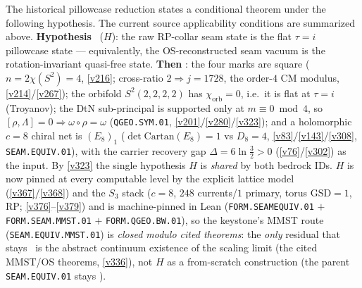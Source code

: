 \begin{keybox}
The historical pillowcase reduction states a conditional theorem under the
following hypothesis. The current source applicability conditions are summarized above.
\textbf{Hypothesis} \mO\ ($H$): the raw RP-collar seam state is the flat $\tau{=}i$ pillowcase state ---
equivalently, the OS-reconstructed seam vacuum is the rotation-invariant quasi-free state. \textbf{Then} \mE:
the four marks are square ($n{=}2\chi(S^2){=}4$, \vref{v216}; cross-ratio $2\Rightarrow j{=}1728$, the order-$4$
CM modulus, \vref{v214}/\vref{v267}); the orbifold $S^2(2,2,2,2)$ has $\chi_{\mathrm{orb}}{=}0$, i.e.\ it is flat
at $\tau{=}i$ (Troyanov); the DtN sub-principal is supported only at $m\equiv0\bmod4$, so
$[\rho,\Lambda]{=}0\Rightarrow\omega\circ\rho{=}\omega$ (\texttt{QGEO.SYM.01}, \vref{v201}/\vref{v280}/\vref{v323});
and a holomorphic $c{=}8$ chiral net is $(E_8)_1$ ($\det\mathrm{Cartan}(E_8){=}1$ vs $D_8{=}4$,
\vref{v83}/\vref{v143}/\vref{v308}, \texttt{SEAM.EQUIV.01}), with the carrier recovery gap
$\Delta{=}6\ln\tfrac32>0$ (\vref{v76}/\vref{v302}) as the input. By \vref{v323} the single hypothesis $H$ is
\emph{shared} by both bedrock IDs. $H$ is now pinned at every computable level by the explicit lattice model
(\vref{v367}/\vref{v368}) and the $S_3$ stack ($c{=}8$, $248$ currents/$1$ primary, torus $\mathrm{GSD}{=}1$, RP;
\vref{v376}--\vref{v379}) and is machine-pinned in Lean (\texttt{FORM.SEAMEQUIV.01} $+$ \texttt{FORM.SEAM.MMST.01}
$+$ \texttt{FORM.QGEO.BW.01}), so the keystone's MMST route (\texttt{SEAM.EQUIV.MMST.01}) is \emph{closed modulo
cited theorems}: the \emph{only} residual that
stays \mO\ is the abstract continuum existence of the scaling limit (the cited MMST/OS theorems, \vref{v336}), not
$H$ as a from-scratch construction (the parent \texttt{SEAM.EQUIV.01} stays \mO).
\end{keybox}

